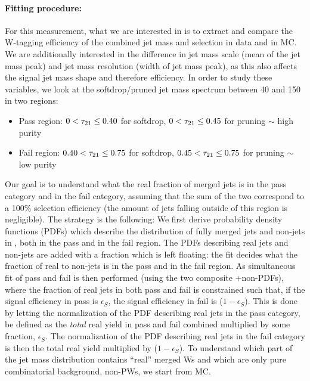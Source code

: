 \paragraph{Fitting procedure:}
For this measurement, what we are interested in is to extract and compare the W-tagging efficiency of the combined jet mass and \nsubj selection in data and in MC. We are additionally interested in the difference in jet mass scale (mean of the \PW jet mass peak) and jet mass resolution (width of \PW jet mass peak), as this also affects the signal jet mass shape and therefore efficiency. In order to study these variables, we look at the softdrop/pruned jet mass spectrum between 40 and 150 \GeV in two regions: 
\begin{itemize}
\itemsep0em 
  \item Pass region: $0 <  \tau_{21} \leq 0.40$ for softdrop, $0 <  \tau_{21} \leq 0.45$ for pruning $\sim$ high purity
  \item Fail region: $0.40 < \tau_{21} \leq 0.75$ for softdrop, $0.45 < \tau_{21} \leq 0.75$ for pruning  $\sim$ low purity
\end{itemize}
Our goal is to understand what the real fraction of merged \PW jets is in the pass category and in the fail category, assuming that the sum of the two correspond to a 100\% selection efficiency (the amount of \PW jets falling outside of this region is negligible).
The strategy is the following: We first derive probability density functions (PDFs) which describe the distribution of fully merged \PW jets and non-\PW jets in \ttbar, both in the pass and in the fail region. The PDFs describing real \PW jets and non-\PW jets are added with a fraction which is left floating: the fit decides what the fraction of real \PW to non-\PW jets is in the pass and in the fail region. As simultaneous fit of pass and fail is then performed (using the two composite \PW+non-\PW PDFs), where the fraction of real \PW jets in both pass and fail is constrained such that, if the signal efficiency in pass is $\epsilon_S$, the signal efficiency in fail is ($1-\epsilon_S$). This is done by letting the normalization of the PDF describing real \PW jets in the pass category, be defined as the \textit{total} real \PW yield in pass and fail combined multiplied by some fraction, $\epsilon_S$. The normalization of the PDF describing real \PW jets in the fail category is then the total real \PW yield multiplied by ($1-\epsilon_S$).\newline
To understand which part of the \ttbar jet mass distribution contains ``real'' merged Ws and which are only pure combinatorial background, non-PWs, we start from \ttbar MC.
